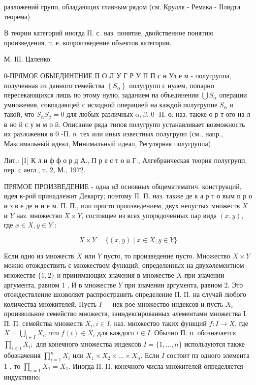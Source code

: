 \documentclass[10pt]{article}
\begin{document}
разложений групп, обладающих главным рядом (см. Крулля - Ремака - ІІлидта теорема)



В теории категорий иногда П. с. наз. понятие, двойственное понятию произведения, т. е. копроизведение объектов категории.



М. ІІІ. Цаленко.



0-ПРЯМОЕ ОБЫЕДИНЕНИЕ П О Л У Г Р У П П с н Ул е м - полугруппа, полученная из данного семейства $\left\{S_{\alpha}\right\}$ полугрупп с нулем, попарно пересекающихся лишь по этому нулю, заданием на объединении $\bigcup S_{\alpha}$ операции умножения, совпадаюцей с исходной операцией на каждой полугруппе $S_{\alpha}$ и такой, что $S_{\alpha} S_{\beta}=0$ для любых различных $\alpha, \beta$. 0 -П. о. наз. также о р т ого на л в но й с у м м о й. Описание ряда типов полугрупп устанавливает возможность их разложения в 0 -П. о. тех или иных известных полугрупп (см., напр., Максимальный идеал, Минимальный идеал, Регулярная полугруппа).



Лит.: [1] К л и ф ф о р д А., П р е с т о н Г., Алгебраическая теория полугрупп, пер. с англ., т. 2, М., 1972.



ПРЯМОЕ ПРОИЗВЕДЕНИЕ - одна иЗ основных общематематич. конструкций, идея к-рой принадлежит Декарту; поэтому П. П. наз. также де к а р т о вым п р о и з в е де н и е м. П. П., или просто пропзведением, двух непустых множеств $X$ и $Y$ наз. множество $X \times Y$, состоящее из всех упорядоченных пар вида $(x, y)$, где $x \in X, y \in Y$ :



\[

X \times Y=\{(x, y) \mid x \in X, y \in Y\}

\]



Если одно из множеств $X$ или $Y$ пусто, то произведение пусто. Множество $X \times Y$ можно отождествить с множеством функций, определенных на двухәлементном множестве $\{1,2\}$ и принимающих значения в множестве $X$ при значении аргумента, равном 1 , И в множестве $Y$ при значении аргумента, равном 2. Это отождествление шозволяет распространить определение П. П. на случай любого количества множителей. Пусть $I-$ нек-рое множество индексов и пусть $X_{i}$ - произвольное семейство множеств, заиндексированных әлементами множества I. П. П. семейства множеств $X_{i}, i \in I$, наз. множество таких функций $f: I \rightarrow X$, где $X=\bigcup_{i \in I} X_{i}$, что $f(i) \in X_{i}$ для каждого $i \in I$. Обычно П. п. обозначается $\prod_{i \in I} X_{i} ;$ для конечного множества индексов $I=\{1, \ldots, n\}$ используются также обозначения $\prod_{i=1}^{n} X_{i}$ или $X_{1} \times X_{2} \times \ldots \times X_{n}$. Если $I$ состоит пз одного элемента 1 , то $\prod_{i=1} X_{1}=X_{1}$. Иногда П. П. конечного числа множителей определяется индуктивно:
\end{document}
